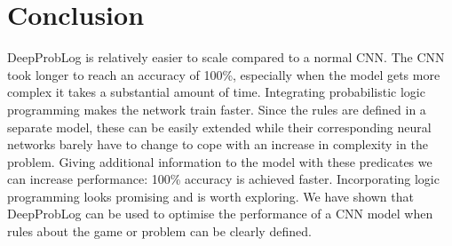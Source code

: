 \section{Conclusion}
DeepProbLog is relatively easier to scale compared to a normal CNN. The CNN took longer to reach an accuracy of 100\%, especially when the model gets more complex it  takes a substantial amount of time. Integrating probabilistic logic programming makes the network train faster. Since the rules are defined in a separate model, these can be easily extended while their corresponding neural networks barely have to change to cope with an increase in complexity in the problem. Giving additional information to the model with these predicates we can increase performance: 100\% accuracy is achieved faster. Incorporating logic programming looks promising and is worth exploring. We have shown that DeepProbLog can be used to optimise the performance of a CNN model when rules about the game or problem can be clearly defined.